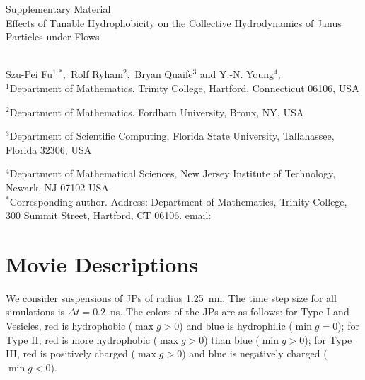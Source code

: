 
\thispagestyle{empty}

\newpage
{\Large \bf

  \noindent Supplementary Material\\

  \noindent 
 Effects of Tunable Hydrophobicity on the Collective Hydrodynamics of Janus Particles under Flows}\\

\noindent 
Szu-Pei Fu$^{1,*},$ 
Rolf Ryham$^{2},$ 
Bryan Quaife$^{3}$ and Y.-N. Young$^{4},$
\\

\noindent
$^{1}$Department of Mathematics, Trinity College, Hartford, Connecticut 06106, USA

\noindent
$^{2}$Department of Mathematics, Fordham University, Bronx, NY, USA

\noindent
$^{3}$Department of Scientific Computing, Florida State University, Tallahassee, Florida 32306, USA

\noindent
$^{4}$Department of Mathematical Sciences, New Jersey Institute of Technology, Newark, NJ 07102 USA
\\

\noindent $^*$Corresponding author. Address: Department of Mathematics, Trinity College, 
300 Summit Street, Hartford, CT 06106. email: 



\setcounter{page}{1}

\setcounter{figure}{0}
\renewcommand{\thefigure}{S\arabic{figure}}

\setcounter{equation}{0}
\renewcommand{\theequation}{S\arabic{equation}}

\setcounter{section}{0}
\renewcommand{\thesection}{S\arabic{section}} 




\section{Movie Descriptions}
We consider suspensions of JPs of radius 1.25~nm. The time step size for
all simulations is $\Delta t = 0.2$~ns. The colors of the JPs are as
follows: for Type I and Vesicles, red is hydrophobic ($\max g > 0$) and
blue is hydrophilic ($\min g = 0$); for Type II, red is more hydrophobic
($\max g >0$) than blue ($\min g > 0$); for Type III, red is positively
charged ($\max g > 0$) and blue is negatively charged ($\min g < 0$).

